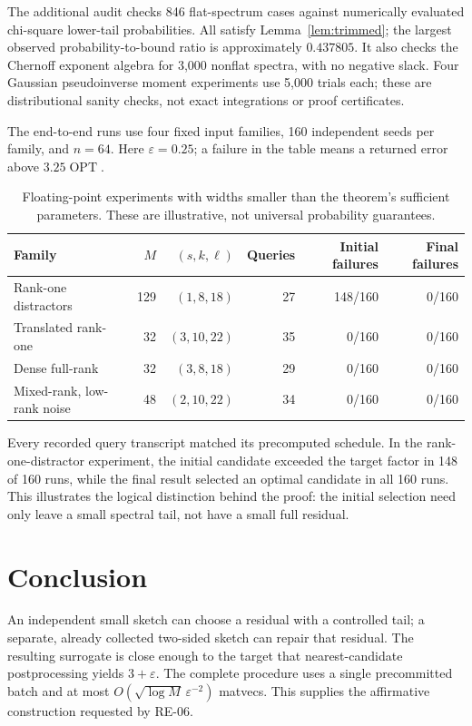 \documentclass[11pt]{article}
\numberwithin{equation}{section}
\theoremstyle{remark}
\newcommand{\OPT}{\operatorname{OPT}}
\begin{document}
The additional audit checks 846 flat-spectrum cases against numerically evaluated chi-square lower-tail probabilities. All satisfy Lemma~\ref{lem:trimmed}; the largest observed probability-to-bound ratio is approximately $0.437805$. It also checks the Chernoff exponent algebra for 3,000 nonflat spectra, with no negative slack. Four Gaussian pseudoinverse moment experiments use 5,000 trials each; these are distributional sanity checks, not exact integrations or proof certificates.

The end-to-end runs use four fixed input families, 160 independent seeds per family, and $n=64$. Here $\varepsilon=0.25$; a failure in the table means a returned error above $3.25\OPT$.
\begin{table}[ht]
\centering
\small
\setlength{\tabcolsep}{4pt}
\begin{tabular}{@{}lrrrrr@{}}
\toprule
Family & $M$ & $(s,k,\ell)$ & Queries & Initial failures & Final failures\\
\midrule
Rank-one distractors &129&$(1,8,18)$&27&148/160&0/160\\
Translated rank-one &32&$(3,10,22)$&35&0/160&0/160\\
Dense full-rank &32&$(3,8,18)$&29&0/160&0/160\\
Mixed-rank, low-rank noise &48&$(2,10,22)$&34&0/160&0/160\\
\bottomrule
\end{tabular}
\caption{Floating-point experiments with widths smaller than the theorem's sufficient parameters. These are illustrative, not universal probability guarantees.}
\label{tab:experiments}
\end{table}

Every recorded query transcript matched its precomputed schedule. In the rank-one-distractor experiment, the initial candidate exceeded the target factor in 148 of 160 runs, while the final result selected an optimal candidate in all 160 runs. This illustrates the logical distinction behind the proof: the initial selection need only leave a small spectral tail, not have a small full residual.

\section*{Conclusion}
An independent small sketch can choose a residual with a controlled tail; a separate, already collected two-sided sketch can repair that residual. The resulting surrogate is close enough to the target that nearest-candidate postprocessing yields $3+\varepsilon$. The complete procedure uses a single precommitted batch and at most $O(\sqrt{\log M}\,\varepsilon^{-2})$ matvecs. This supplies the affirmative construction requested by RE-06.
\end{document}
